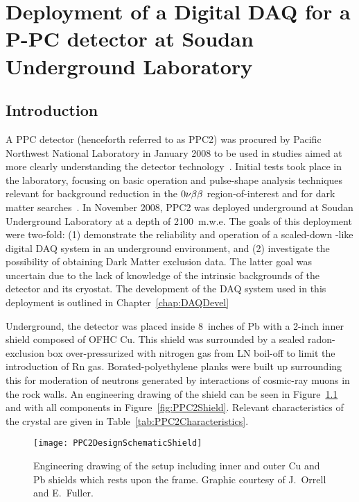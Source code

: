 
\chapter{Deployment of a Digital DAQ for a P-PC detector at Soudan Underground Laboratory}
\label{chap:DeploymentPPC2Soudan}
	\section{Introduction}
	\label{sec:DeploymentPPC2SoudanIntro}
			
		A PPC detector (henceforth referred to as PPC2) was procured by Pacific Northwest National Laboratory in January 2008 to be used in studies aimed at more clearly understanding the detector technology~\cite{Orr2007}.  Initial tests took place in the laboratory, focusing on basic operation and pulse-shape analysis techniques relevant for background reduction in the $0 \nu \beta \beta$ region-of-interest and for dark matter searches~\cite{Orr2008}.  In November 2008, PPC2 was deployed underground at Soudan Underground Laboratory at a depth of 2100~m.w.e.  The goals of this deployment were two-fold: (1) demonstrate the reliability and operation of a scaled-down \MJ-like digital DAQ system in an underground environment, and (2) investigate the possibility of obtaining Dark Matter exclusion data.  The latter goal was uncertain due to the lack of knowledge of the intrinsic backgrounds of the detector and its cryostat.  The development of the DAQ system used in this deployment is outlined in Chapter~\ref{chap:DAQDevel}
		
		Underground, the detector was placed inside 8~inches of Pb with a 2-inch inner shield composed of OFHC Cu.  This shield was surrounded by a sealed radon-exclusion box over-pressurized with nitrogen gas from LN boil-off to limit the introduction of Rn gas.  Borated-polyethylene planks were built up surrounding this for moderation of neutrons generated by interactions of cosmic-ray muons in the rock walls.  An engineering drawing of the shield can be seen in Figure~\ref{fig:PPC2OnlyShield} and with all components in Figure~\ref{fig:PPC2Shield}.  Relevant characteristics of the crystal are given in Table~\ref{tab:PPC2Characteristics}.
	
			\begin{figure}
				\centering
				\texttt{[image: PPC2DesignSchematicShield]}
				\caption[Engineering drawing of PPC2 deployment]
				{Engineering drawing of the setup including inner and outer Cu and Pb shields which rests upon the frame.
				Graphic courtesy of J.~Orrell and E.~Fuller.}
				\label{fig:PPC2OnlyShield}
			\end{figure}
	
